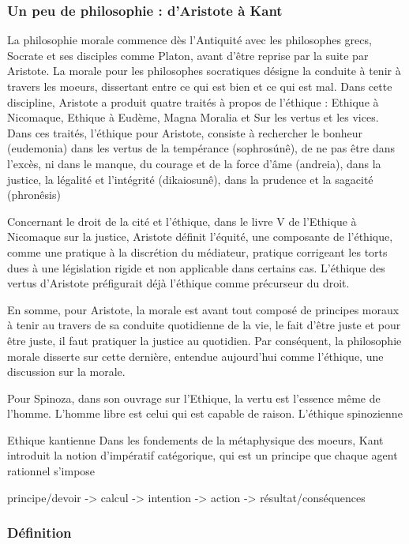 \subsubsection{Un peu de philosophie : d'Aristote à Kant}

La philosophie morale commence dès l'Antiquité avec les philosophes grecs, Socrate et ses disciples comme Platon, avant d'être reprise par la suite par Aristote. La morale pour les philosophes socratiques désigne la conduite à tenir à travers les moeurs, dissertant entre ce qui est bien et ce qui est mal. Dans cette discipline, Aristote a produit quatre traités à propos de l'éthique : Ethique à Nicomaque, Ethique à Eudème, Magna Moralia et Sur les vertus et les vices. Dans ces traités, l'éthique pour Aristote, consiste à rechercher le bonheur (eudemonia) dans les vertus de la tempérance (sophrosúnê), de ne pas être dans l'excès, ni dans le manque, du courage et de la force d'âme (andreia), dans la justice, la légalité et l'intégrité (dikaiosunê), dans la prudence et la sagacité (phronêsis)

Concernant le droit de la cité et l'éthique, dans le livre V de l'Ethique à Nicomaque sur la justice, Aristote définit l'équité, une composante de l'éthique, comme une pratique à la discrétion du médiateur, pratique corrigeant les torts dues à une législation rigide et non applicable dans certains cas. L'éthique des vertus d'Aristote préfigurait déjà l'éthique comme précurseur du droit.

En somme, pour Aristote, la morale est avant tout composé de principes moraux à tenir au travers de sa conduite quotidienne de la vie, le fait d'être juste et pour être juste, il faut pratiquer la justice au quotidien. Par conséquent, la philosophie morale disserte sur cette dernière, entendue aujourd'hui comme l'éthique, une discussion sur la morale.


Pour Spinoza, dans son ouvrage sur l'Ethique, la vertu est l'essence même de l'homme. L'homme libre est celui qui est capable de raison.  
L'éthique spinozienne

Ethique kantienne
Dans les fondements de la métaphysique des moeurs, Kant introduit la notion d'impératif catégorique, qui est un principe que chaque agent rationnel s'impose


principe/devoir -> calcul -> intention -> action -> résultat/conséquences
\subsubsection{Définition}

